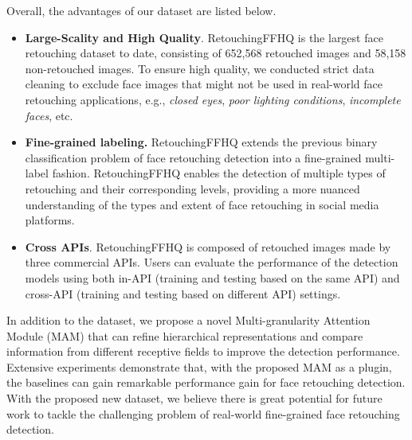 \documentclass[sigconf]{acmart}
\begin{document}
Overall, the advantages of our dataset are listed below.

\begin{itemize}
\item \textbf{Large-Scality and High Quality}. 
RetouchingFFHQ is the largest face retouching dataset to date, consisting of 652,568 retouched images and 58,158 non-retouched images. To ensure high quality, we conducted strict data cleaning to exclude face images that might not be used in real-world face retouching applications, e.g., \textit{closed eyes}, \textit{poor lighting conditions}, \textit{incomplete faces}, etc.

\item \textbf{Fine-grained labeling.} RetouchingFFHQ extends the previous binary classification problem of face retouching detection into a fine-grained multi-label fashion. RetouchingFFHQ enables the detection of multiple types of retouching and their corresponding levels, providing a more nuanced understanding of the types and extent of face retouching in social media platforms.


\item \textbf{Cross APIs}. RetouchingFFHQ is composed of retouched images made by three commercial APIs. Users can evaluate the performance of the detection models using both in-API (training and testing based on the same API) and cross-API (training and testing based on different API) settings.
\end{itemize}

In addition to the dataset, we propose a novel Multi-granularity Attention Module (MAM) that can refine hierarchical representations and compare information from different receptive fields to improve the detection performance. Extensive experiments demonstrate that, with the proposed MAM as a plugin, the baselines can gain remarkable performance gain for face retouching detection.
With the proposed new dataset, we believe there is great potential for future work to tackle the challenging problem of real-world fine-grained face retouching detection.
\end{document}
